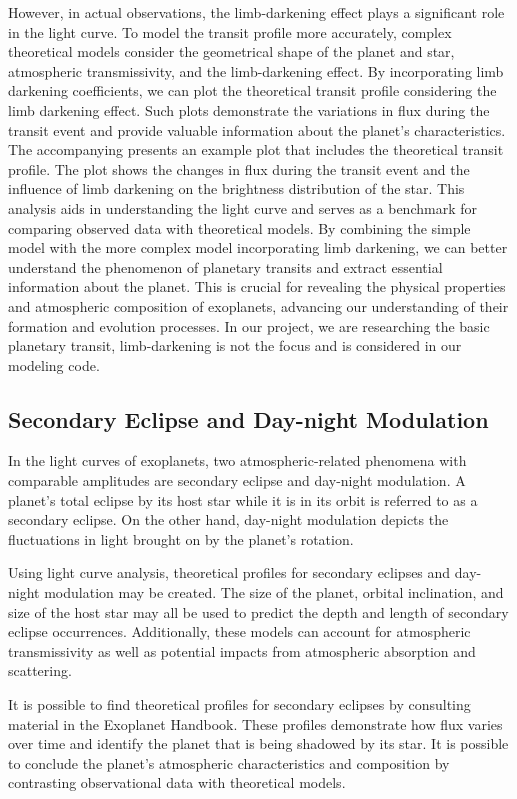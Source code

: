 \documentclass{article}
\begin{document}
However, in actual observations, the limb-darkening effect plays a significant role in the light curve. To model the transit profile more accurately, complex theoretical models consider the geometrical shape of the planet and star, atmospheric transmissivity, and the limb-darkening effect. By incorporating limb darkening coefficients, we can plot the theoretical transit profile considering the limb darkening effect. Such plots demonstrate the variations in flux during the transit event and provide valuable information about the planet's characteristics. The accompanying presents an example plot that includes the theoretical transit profile. The plot shows the changes in flux during the transit event and the influence of limb darkening on the brightness distribution of the star. This analysis aids in understanding the light curve and serves as a benchmark for comparing observed data with theoretical models. By combining the simple model with the more complex model incorporating limb darkening, we can better understand the phenomenon of planetary transits and extract essential information about the planet. This is crucial for revealing the physical properties and atmospheric composition of exoplanets, advancing our understanding of their formation and evolution processes. In our project, we are researching the basic planetary transit, limb-darkening is not the focus and is considered in our modeling code.

\subsection{Secondary Eclipse and Day-night Modulation}

In the light curves of exoplanets, two atmospheric-related phenomena with comparable amplitudes are secondary eclipse and day-night modulation. A planet's total eclipse by its host star while it is in its orbit is referred to as a secondary eclipse. On the other hand, day-night modulation depicts the fluctuations in light brought on by the planet's rotation.

Using light curve analysis, theoretical profiles for secondary eclipses and day-night modulation may be created. The size of the planet, orbital inclination, and size of the host star may all be used to predict the depth and length of secondary eclipse occurrences. Additionally, these models can account for atmospheric transmissivity as well as potential impacts from atmospheric absorption and scattering.

It is possible to find theoretical profiles for secondary eclipses by consulting material in the Exoplanet Handbook. These profiles demonstrate how flux varies over time and identify the planet that is being shadowed by its star. It is possible to conclude the planet's atmospheric characteristics and composition by contrasting observational data with theoretical models.
\end{document}
